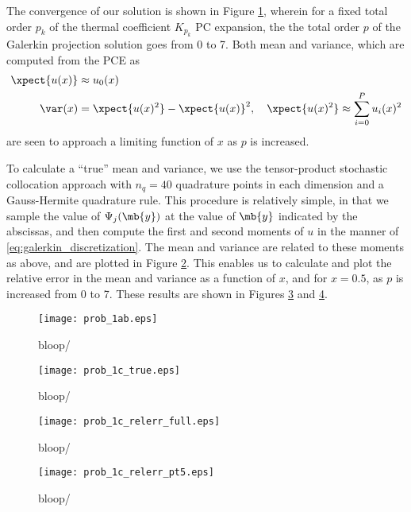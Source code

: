 \documentclass[11pt]{article}
\begin{document}
The convergence of our solution is shown in Figure \ref{fig:1ab}, wherein for a fixed total order $p_k$ of the thermal coefficient $K_{p_k}$ PC expansion, the the total order $p$ of the Galerkin projection solution goes from 0 to 7. Both mean and variance, which are computed from the PCE as
\begin{equation}
\begin{aligned}
\xpect{u(x)}   &\approx u_0(x) \\
\var(x) &= \xpect{u(x)^2} - \xpect{u(x)}^2, \quad
\xpect{u(x)^2} \approx \sum_{i=0}^P u_i(x)^2
\end{aligned}
\end{equation}
are seen to approach a limiting function of $x$ as $p$ is increased.

To calculate a ``true'' mean and variance, we use the tensor-product stochastic collocation approach with $n_q=40$ quadrature points in each dimension and a Gauss-Hermite quadrature rule. This procedure is relatively simple, in that we sample the value of $\Psi_j(\mb{y})$ at the value of $\mb{y}$ indicated by the abscissas, and then compute the first and second moments of $u$ in the manner of \eqref{eq:galerkin_discretization}. The mean and variance are related to these moments as above, and are plotted in Figure \ref{fig:1c_true}. This enables us to calculate and plot the relative error in the mean and variance as a function of $x$, and for $x=0.5$, as $p$ is increased from 0 to 7. These results are shown in Figures \ref{fig:1c_relerr_full} and \ref{fig:1c_relerr_pt5}.

\begin{figure}[h]
\centering
\texttt{[image: prob\_1ab.eps]}
\caption{bloop/}
\label{fig:1ab}
\end{figure}

\begin{figure}[h]
\centering
\texttt{[image: prob\_1c\_true.eps]}
\caption{bloop/}
\label{fig:1c_true}
\end{figure}

\begin{figure}[h]
\centering
\texttt{[image: prob\_1c\_relerr\_full.eps]}
\caption{bloop/}
\label{fig:1c_relerr_full}
\end{figure}

\begin{figure}[h]
\centering
\texttt{[image: prob\_1c\_relerr\_pt5.eps]}
\\[1em]
\caption{bloop/}
\label{fig:1c_relerr_pt5}
\end{figure}


\end{document}

